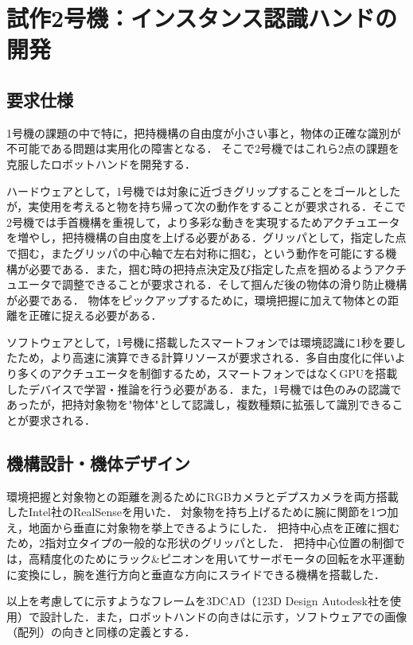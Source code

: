 \chapter{試作2号機：インスタンス認識ハンドの開発}
\newpage

\section{要求仕様}
1号機の課題の中で特に，把持機構の自由度が小さい事と，物体の正確な識別が不可能である問題は実用化の障害となる．
そこで2号機ではこれら2点の課題を克服したロボットハンドを開発する．

ハードウェアとして，1号機では対象に近づきグリップすることをゴールとしたが，実使用を考えると物を持ち帰って次の動作をすることが要求される．そこで2号機では手首機構を重視して，より多彩な動きを実現するためアクチュエータを増やし，把持機構の自由度を上げる必要がある．グリッパとして，指定した点で掴む，またグリッパの中心軸で左右対称に掴む，という動作を可能にする機構が必要である．また，掴む時の把持点決定及び指定した点を掴めるようアクチュエータで調整できることが要求される．そして掴んだ後の物体の滑り防止機構が必要である．
物体をピックアップするために，環境把握に加えて物体との距離を正確に捉える必要がある．

ソフトウェアとして，1号機に搭載したスマートフォンでは環境認識に1秒を要したため，より高速に演算できる計算リソースが要求される．多自由度化に伴いより多くのアクチュエータを制御するため，スマートフォンではなくGPUを搭載したデバイスで学習・推論を行う必要がある．また，1号機では色のみの認識であったが，把持対象物を"物体"として認識し，複数種類に拡張して識別できることが要求される．


\section{機構設計・機体デザイン}
環境把握と対象物との距離を測るためにRGBカメラとデプスカメラを両方搭載したIntel社のRealSenseを用いた．
対象物を持ち上げるために腕に関節を1つ加え，地面から垂直に対象物を挙上できるようにした．
把持中心点を正確に掴むため，2指対立タイプの一般的な形状のグリッパとした．
把持中心位置の制御では，高精度化のためにラック\&ピニオンを用いてサーボモータの回転を水平運動に変換にし，腕を進行方向と垂直な方向にスライドできる機構を搭載した．

以上を考慮してに示すようなフレームを3DCAD（123D Design Autodesk社を使用）で設計した．また，ロボットハンドの向きはに示す，ソフトウェアでの画像（配列）の向きと同様の定義とする．


